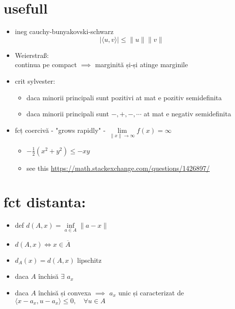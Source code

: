 \documentclass[11pt]{article}
\date{\today}
\title{}
\begin{document}
\section*{usefull}
\label{sec:org5fe98a3}
\begin{itemize}
\item ineg cauchy-bunyakovski-schwarz
\[
| \langle u, v\rangle | \leq \| u\| \|v\|
\]
\item Weierstraß:\\
continua pe compact \(\implies\) marginită și-și atinge marginile
\item crit sylvester:
\begin{itemize}
\item daca minorii principali sunt pozitivi at mat e pozitiv semidefinita
\item daca minorii principali sunt \(-, +, -,\cdots\) at mat e negativ semidefinita
\end{itemize}
\item fcț coercivă - "grows rapidly" -  \(\lim\limits_{\|x\|\to \infty} f(x) = \infty\)
\begin{itemize}
\item \(-\frac{1}{2} (x^2+y^2) \leq - xy\)
\item see this \url{https://math.stackexchange.com/questions/1426897/}
\end{itemize}
\end{itemize}
\section*{fct distanta:}
\label{sec:org6027143}
\begin{itemize}
\item def \(d(A, x) = \inf\limits_{a\in A} \| a-x\|\)
\item \(d(A, x) \iff x \in \overline{A}\)
\item \(d_A(x) = d(A, x)\) lipschitz
\item daca \(A\) închisă \(\exists\) \(a_x\)
\item daca \(A\) închisă și convexa \(\implies\) \(a_x\) unic și caracterizat de  \(\langle x-a_x, u-a_x \rangle \leq 0,\quad \forall u \in A\)
\end{itemize}
\end{document}
